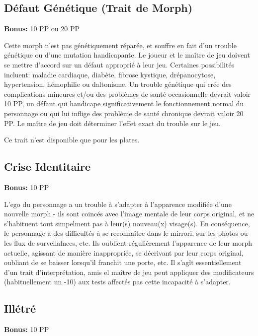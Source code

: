 \subsection{Défaut Génétique (Trait de Morph)} \label{sec:traits-genetic-defect} 

\textbf{Bonus:} 10 PP ou 20 PP 

Cette morph n'est pas génétiquement réparée, et souffre en fait d'un trouble génétique ou d'une mutation handicapante. Le joueur et le maître de jeu doivent se mettre d'accord sur un défaut approprié à leur jeu. Certaines possibilités incluent: maladie cardiaque, diabète, fibrose kystique, drépanocytose, hypertension, hémophilie ou daltonisme. Un trouble génétique qui crée des complications mineures et/ou des problèmes de santé occasionnelle devrait valoir 10 PP, un défaut qui handicape significativement le fonctionnement normal du personnage ou qui lui inflige des problème de santé chronique devrait valoir 20 PP. Le maître de jeu doit déterminer l'effet exact du trouble sur le jeu. 

Ce trait n'est disponible que pour les plates. 

\subsection{Crise Identitaire} \label{sec:traits-identity-crisis} 

\textbf{Bonus:} 10 PP 

L'ego du personnage a un trouble à s'adapter à l'apparence modifiée d'une nouvelle morph - ils sont coincés avec l'image mentale de leur corps original, et ne s'habituent tout simpelment pas à leur(s) nouveau(x) visage(s). En conséquence, le personnage a des difficultés à se reconnaître dans le mirrori, sur les photos ou les flux de surveilalnces, etc. Ils oublient régulièrement l'apparence de leur morph actuelle, agissant de manière inappropriée, se décrivant par leur corps original, oubliant de se baisser lorsqu'il franchit une porte, etc. Il s'agît essentiellement d'un trait d'interprétation, amis el maître de jeu peut appliquer des modificateurs (habituellement un -10) aux tests affectés pas cette incapacité à s'adapter. 

\subsection{Illétré} \label{sec:traits-illiterate} 

\textbf{Bonus:} 10 PP 

